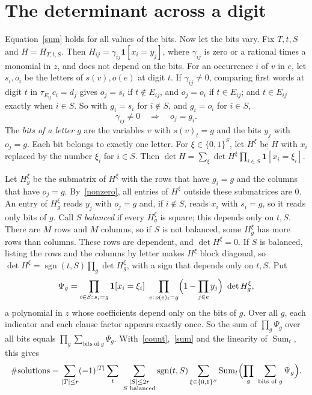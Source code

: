 \documentclass[10pt]{article}
\newcommand{\bits}{\{0,1\}}
\begin{document}
\section{The determinant across a digit}

Equation~\eqref{sum} holds for all values of the bits. Now let the bits vary. Fix $T,t,S$ and $H=H_{T,t,S}$. Then $H_{ij}=\gamma_{ij}\mathbf 1[x_i=y_j]$, where $\gamma_{ij}$ is zero or a rational times a monomial in $z$, and does not depend on the bits. For an occurrence $i$ of $v$ in $e$, let $s_i,o_i$ be the letters of $s(v),o(e)$ at digit $t$. If $\gamma_{ij}\ne0$, comparing first words at digit $t$ in $\tau_{E_{ij}}c_i=d_j$ gives $o_j=s_i$ if $t\notin E_{ij}$, and $o_j=o_i$ if $t\in E_{ij}$; and $t\in E_{ij}$ exactly when $i\in S$. So with $g_i=s_i$ for $i\notin S$, and $g_i=o_i$ for $i\in S$,
\begin{equation}\label{nonzero}
\gamma_{ij}\ne0\quad\Longrightarrow\quad o_j=g_i.
\end{equation}
The \emph{bits of a letter $g$} are the variables $v$ with $s(v)_t=g$ and the bits $y_j$ with $o_j=g$. Each bit belongs to exactly one letter. For $\xi\in\bits^S$, let $H^\xi$ be $H$ with $x_i$ replaced by the number $\xi_i$ for $i\in S$. Then $\det H=\sum_\xi\det H^\xi\prod_{i\in S}\mathbf 1[x_i=\xi_i]$.

Let $H^\xi_g$ be the submatrix of $H^\xi$ with the rows that have $g_i=g$ and the columns that have $o_j=g$. By~\eqref{nonzero}, all entries of $H^\xi$ outside these submatrices are $0$. An entry of $H^\xi_g$ reads $y_j$ with $o_j=g$ and, if $i\notin S$, reads $x_i$ with $s_i=g$, so it reads only bits of $g$. Call $S$ \emph{balanced} if every $H^\xi_g$ is square; this depends only on $t,S$. There are $M$ rows and $M$ columns, so if $S$ is not balanced, some $H^\xi_g$ has more rows than columns. These rows are dependent, and $\det H^\xi=0$. If $S$ is balanced, listing the rows and the columns by letter makes $H^\xi$ block diagonal, so $\det H^\xi=\operatorname{sgn}(t,S)\prod_g\det H^\xi_g$, with a sign that depends only on $t,S$. Put
\[
\Psi_g=\prod_{i\in S:\,s_i=g}\mathbf 1[x_i=\xi_i]\ \prod_{e:\,o(e)_t=g}\Bigl(1-\prod_{j\in e}y_j\Bigr)\ \det H^\xi_g,
\]
a polynomial in $z$ whose coefficients depend only on the bits of $g$. Over all $g$, each indicator and each clause factor appears exactly once. So the sum of $\prod_g\Psi_g$ over all bits equals $\prod_g\sum_{\text{bits of }g}\Psi_g$. With~\eqref{count},~\eqref{sum} and the linearity of $\operatorname{Sum}_t$, this gives
\begin{equation}\label{final}
\#\text{solutions}=\sum_{|T|\le r}(-1)^{|T|}\sum_t\ \sum_{\substack{|S|\le2r\\S\text{ balanced}}}\operatorname{sgn}(t,S)\sum_{\xi\in\bits^S}\operatorname{Sum}_t\Bigl(\prod_g\ \sum_{\text{bits of }g}\Psi_g\Bigr).
\end{equation}
\end{document}
